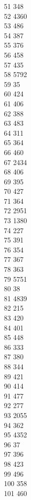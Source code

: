 { 51	348 \\
 52	4360 \\
 53	486 \\
 54	387 \\
 55	376 \\
 56	458 \\
 57	435 \\
 58	5792 \\
 59	35 \\
 60	424 \\
 61	406 \\
 62	388 \\
 63	483 \\
 64	311 \\
 65	364 \\
 66	460 \\
 67	2434 \\
 68	406 \\
 69	395 \\
 70	427 \\
 71	364 \\
 72	2951 \\
 73	1380 \\
 74	227 \\
 75	391 \\
 76	354 \\
 77	367 \\
 78	363 \\
 79	5751 \\
 80	38 \\
 81	4839 \\
 82	215 \\
 83	420 \\
 84	401 \\
 85	448 \\
 86	333 \\
 87	380 \\
 88	344 \\
 89	421 \\
 90	414 \\
 91	477 \\
 92	277 \\
 93	2055 \\
 94	362 \\
 95	4352 \\
 96	37 \\
 97	396 \\
 98	423 \\
 99	496 \\
 100	358 \\
 101	460 \\
}
